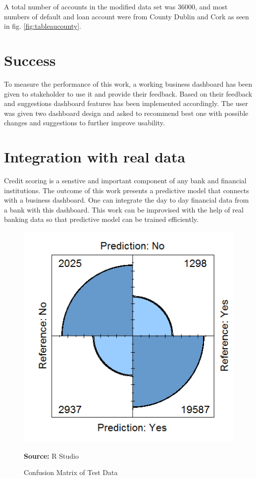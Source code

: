 A total number of accounts in the modified data set was 36000, and most numbers of default and loan account were from County Dublin and Cork as seen in fig. \ref{fig:tableaucounty}.

\section{Success}\label{S.succes}

To measure the performance of this work, a working business dashboard has been given to stakeholder to use it and provide their feedback. Based on their feedback and suggestions dashboard features has been implemented accordingly. The user was given two dashboard design and asked to recommend best one with possible changes and suggestions to further improve usability.

\section{Integration with real data}

Credit scoring is a senstive and important component of any bank and financial institutions. The outcome of this work presents a predictive model that connects with a business dashboard. One can integrate the day to day financial data from a bank with this dashboard. This work can be improvised with the help of real banking data so that predictive model can be trained efficiently.

\begin{center}
\begin{figure}[!htb]
\includegraphics[width=\textwidth]{DTcm.png}
\centering
\caption{Confusion Matrix of Test Data}{\textbf{Source:} R Studio}
\label{fig:DTcm}
\end{figure}
\end{center}

